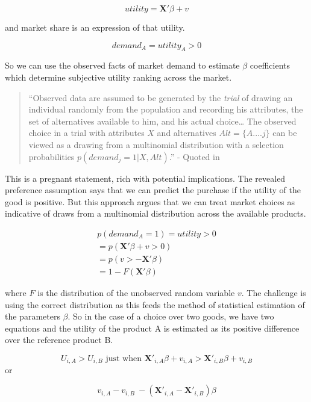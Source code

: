 \documentclass[]{tufte-book}
\theoremstyle{definition}
\theoremstyle{definition}
\theoremstyle{definition}
\theoremstyle{remark}
\begin{document}
\[ utility = \mathbf{X'}\beta + v\]

and market share is an expression of that utility.

\[ demand_A = utility_{A} > 0 \]

So we can use the observed facts of market demand to estimate \(\beta\) coefficients which determine subjective utility ranking across the market.

\begin{quote}
``Observed data are assumed to be generated by the \emph{trial} of drawing an individual randomly from the population and recording his attributes, the set of alternatives available to him, and his actual choice\ldots{} The observed choice in a trial with attributes \(X\) and alternatives \(Alt = \{A.... j \}\) can be viewed as a drawing from a multinomial distribution with a selection probabilities \(p(demand_{j} = 1| X, Alt)\).'' - Quoted in \citep{McFaddenCondLogit}
\end{quote}

This is a pregnant statement, rich with potential implications. The revealed preference assumption says that we can predict the purchase if the utility of the good is positive. But this approach argues that we can treat market choices as indicative of draws from a multinomial distribution across the available products.

\begin{equation} \begin{split} p(demand_A = 1) = utility > 0 \\ = p(\mathbf{X'}\beta + v > 0) \\ = p(v > - \mathbf{X'}\beta ) \\ = 1 - F(\mathbf{X'}\beta ) \end{split} \end{equation}

where \(F\) is the distribution of the unobserved random variable \(v\). The challenge is using the correct distribution as this feeds the method of statistical estimation of the parameters \(\beta\). So in the case of a choice over two goods, we have two equations and the utility of the product A is estimated as its positive difference over the reference product B.

\[ U_{i,A} > U_{i, B} \text{ just when } \mathbf{X'}_{i, A}\beta + v_{i,A} > \mathbf{X'}_{i, B}\beta + v_{i,B}\] or

\[ v_{i,A} - v_{i,B} \> - (\mathbf{X'}_{i, A} - \mathbf{X'}_{i, B})\beta \]
\end{document}
